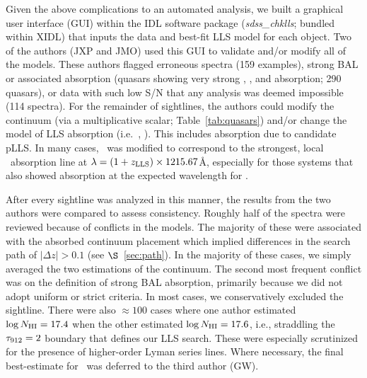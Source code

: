 \documentclass[12pt,preprint]{aastex}
\begin{document}
Given the above complications to an automated analysis, we
built a graphical user interface (GUI) within the IDL software
package ({\it sdss\_chklls}; bundled within XIDL)
that inputs the data and best-fit LLS model for each object.
Two of the authors (JXP and JMO) used this GUI to validate
and/or modify all of the models.  These authors 
flagged erroneous spectra (159 examples), 
strong BAL or associated absorption (quasars showing very strong
, , and  absorption; 290 quasars), 
or data with such low
S/N that any analysis was deemed impossible (114 spectra).
For the remainder of sightlines, the authors
could modify the continuum (via a multiplicative scalar; Table~\ref{tab:quasars})
and/or change the model of LLS absorption (i.e.\ \zlls, \nhi).
This includes absorption due to candidate pLLS.  
In many cases, \zlls\ was modified to correspond to the strongest,
local \lya\ absorption line at $\lambda = (1+z_{\rm LLS}) \times 1215.67$\AA,
especially for those systems that also showed absorption at the
expected wavelength for \lyb.

After every sightline was analyzed in this manner,
the results from the two authors were compared to assess
consistency.  Roughly half of the spectra were reviewed
because of conflicts in the models.
The majority of these were associated 
with the absorbed continuum placement which implied 
differences in the search path of $|\Delta z| > 0.1$
(see $\S$~\ref{sec:path}).
In the majority of these cases, we simply averaged the
two estimations of the continuum.  
The second most frequent conflict was on the definition
of strong BAL absorption, primarily because we did not adopt
uniform or strict criteria.  In most cases, we 
conservatively excluded the sightline.
There were also $\approx 100$ cases where one author estimated
$\log N_{\rm HI} = 17.4$ when the other estimated   
$\log N_{\rm HI} = 17.6$, i.e., straddling the $\tau_{\rm 912}=2$ boundary
that defines our LLS search. 
These were especially scrutinized for the presence of
higher-order Lyman series lines. 
Where necessary, the final best-estimate for \nhi\ was 
deferred to the third author (GW).
\end{document}
